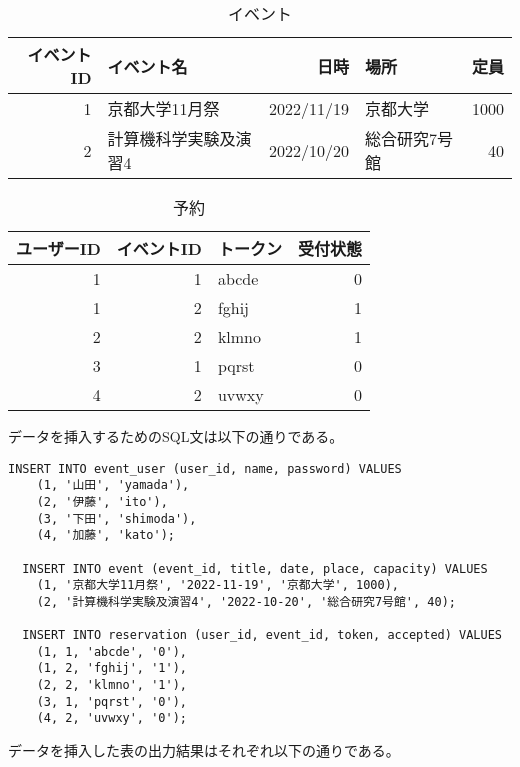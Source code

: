 \documentclass[dvipdfmx]{jarticle}
\begin{document}
\begin{table}[H]
  \centering
   \begin{tabular}{|r|l|r|l|r|}
    \hline
    イベントID & イベント名 & 日時 & 場所 & 定員 \\
    \hline \hline
    1 & 京都大学11月祭 & 2022/11/19 & 京都大学 & 1000 \\
    2 & 計算機科学実験及演習4 & 2022/10/20 & 総合研究7号館 & 40 \\
    \hline
  \end{tabular}
  \caption{イベント}
\end{table}

\begin{table}[H]
  \centering
   \begin{tabular}{|r|r|l|r|}
    \hline
    ユーザーID & イベントID & トークン & 受付状態 \\
    \hline \hline
    1 & 1 & abcde & 0 \\
    1 & 2 & fghij & 1 \\
    2 & 2 & klmno & 1 \\
    3 & 1 & pqrst & 0 \\
    4 & 2 & uvwxy & 0 \\
    \hline
  \end{tabular}
  \caption{予約}
\end{table}

データを挿入するためのSQL文は以下の通りである。

\begin{lstlisting}[caption=insertion]
  INSERT INTO event_user (user_id, name, password) VALUES 
    (1, '山田', 'yamada'),
    (2, '伊藤', 'ito'),
    (3, '下田', 'shimoda'),
    (4, '加藤', 'kato');

  INSERT INTO event (event_id, title, date, place, capacity) VALUES 
    (1, '京都大学11月祭', '2022-11-19', '京都大学', 1000),
    (2, '計算機科学実験及演習4', '2022-10-20', '総合研究7号館', 40);

  INSERT INTO reservation (user_id, event_id, token, accepted) VALUES 
    (1, 1, 'abcde', '0'),
    (1, 2, 'fghij', '1'),
    (2, 2, 'klmno', '1'),
    (3, 1, 'pqrst', '0'),
    (4, 2, 'uvwxy', '0');
\end{lstlisting}

データを挿入した表の出力結果はそれぞれ以下の通りである。
\end{document}
